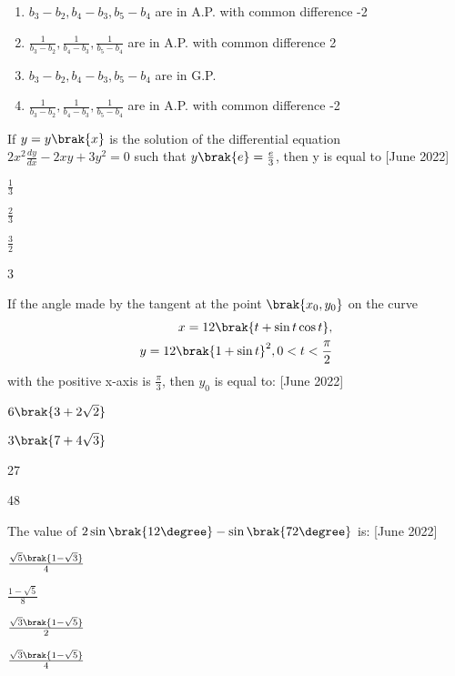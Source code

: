 \begin{enumerate}
    \item $b_3-b_2,b_4-b_3,b_5-b_4$ are in A.P. with common difference -2
    \item $\frac{1}{b_3-b_2},\frac{1}{b_4-b_3},\frac{1}{b_5-b_4}$ are in A.P. with common difference 2
    \item $b_3-b_2,b_4-b_3,b_5-b_4$ are in G.P.
    \item $\frac{1}{b_3-b_2},\frac{1}{b_4-b_3},\frac{1}{b_5-b_4}$ are in A.P. with common difference -2
\end{enumerate}
\bigskip
\item If $y=y\brak{x}$ is the solution of the differential equation $2x^2\frac{dy}{dx}-2xy+3y^2=0$ such that $y\brak{e}=\frac{e}{3}$, then y is equal to \hfill{[June 2022]}
\begin{enumerate}
    \begin{multicols}{4}
    \item $\frac{1}{3}$
       \item $\frac{2}{3}$
       \item $\frac{3}{2}$
       \item 3
    \end{multicols}
\end{enumerate}
\bigskip
\item If the angle made by the tangent at the point $\brak{x_0,y_0}$ on the curve 
\begin{align*}
    x=12\brak{t+\sin{t}\cos{t}},\\
    y=12\brak{1+\sin{t}}^2, 0<t<\frac{\pi}{2}
\end{align*}
with the positive x-axis is $\frac{\pi}{3}$, then $y_0$ is equal to: \hfill{[June 2022]}
\begin{enumerate}

    \begin{multicols}{2}
        \item $6\brak{3+2\sqrt{2}}$
        \columnbreak
        \item $3\brak{7+4\sqrt{3}}$
    \end{multicols}
    \begin{multicols}{2}
        \item 27
        \item 48
    \end{multicols}
\end{enumerate}
\bigskip
\item The value of $2\sin{\brak{12\degree}}-\sin{\brak{72\degree}}$ is: \hfill{[June 2022]}
\begin{enumerate}
    \begin{multicols}{2}
    \item $\frac{\sqrt{5}\brak{1-\sqrt{3}}}{4}$
        \columnbreak
        \item $\frac{1-\sqrt{5}}{8}$
    \end{multicols}
    \begin{multicols}{2}
    \item $\frac{\sqrt{3}\brak{1-\sqrt{5}}}{2}$
        \item $\frac{\sqrt{3}\brak{1-\sqrt{5}}}{4}$
    \end{multicols}
\end{enumerate}
